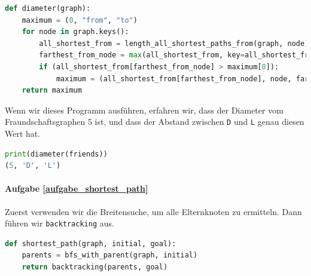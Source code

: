 \begin{enumerate}[(a)]
\begin{lstlisting}[language=Python, caption={Programm, welches den Diameter von einem Graphen bestimmt}]
def diameter(graph):
    maximum = (0, "from", "to")
    for node in graph.keys():
        all_shortest_from = length_all_shortest_paths_from(graph, node)
        farthest_from_node = max(all_shortest_from, key=all_shortest_from.get)
        if (all_shortest_from[farthest_from_node] > maximum[0]):
            maximum = (all_shortest_from[farthest_from_node], node, farthest_from_node)
    return maximum
\end{lstlisting}
Wenn wir dieses Programm ausführen, erfahren wir, dass der Diameter vom Fraundschaftsgraphen 5 ist, und dass der Abstand zwischen \texttt{D} und \texttt{L} genau diesen Wert hat.
\begin{lstlisting}[language=Python]
print(diameter(friends))
(5, 'D', 'L')
\end{lstlisting}
\end{enumerate}

\paragraph{Aufgabe \ref{aufgabe_shortest_path}}
Zuerst verwenden wir die Breitensuche, um alle Elternknoten zu ermitteln. Dann führen wir \texttt{backtracking} aus.
\begin{lstlisting}[language=Python]
def shortest_path(graph, initial, goal):
    parents = bfs_with_parent(graph, initial)
    return backtracking(parents, goal)
\end{lstlisting}

